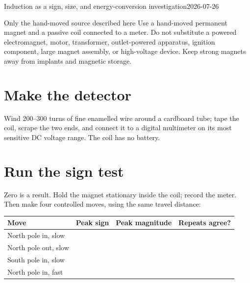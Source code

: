 

  {Induction as a sign, size, and energy-conversion investigation}{2026-07-26}


\begin{teloshazard}{Only the hand-moved source described here}
Use a hand-moved permanent magnet and a passive coil connected to a meter.
Do not substitute a powered electromagnet, motor, transformer, outlet-powered
apparatus, ignition component, large magnet assembly, or high-voltage device.
Keep strong magnets away from implants and magnetic storage. \stopline
\end{teloshazard}

\section{Make the detector}
Wind 200--300 turns of fine enamelled wire around a cardboard tube; tape the
coil, scrape the two ends, and connect it to a digital multimeter on its most
sensitive DC voltage range. The coil has no battery.

\begin{center}
\end{center}

\section{Run the sign test}
Zero is a result. Hold the magnet stationary inside the coil; record the meter.
Then make four controlled moves, using the same travel distance:

\begin{tabularx}{\linewidth}{@{}L C C C@{}}
\toprule
Move & Peak sign & Peak magnitude & Repeats agree?\\ \midrule
North pole in, slow &&&\\
North pole out, slow &&&\\
South pole in, slow &&&\\
North pole in, fast &&&\\
\bottomrule
\end{tabularx}

